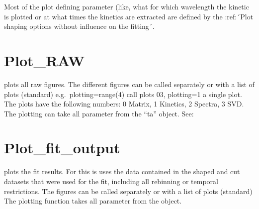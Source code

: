 \documentclass[letterpaper,10pt,english]{sphinxmanual}
\begin{document}
Most of the plot defining parameter (like, what for which wavelength the kinetic
is plotted or at what times the kinetics are extracted are defined by the
:ref:´Plot shaping options without influence on the fitting´.


\section{Plot\_RAW}
\label{\detokenize{Plotting:plot-raw}}
{\hyperref[\detokenize{plot_func:plot_func.TA.Plot_RAW}]{}} plots all raw figures. The different figures can be called
separately or with a list of plots (standard) e.g. plotting=range(4)
call plots 0\sphinxhyphen{}3, plotting=1 a single plot. The plots have the following
numbers: 0 \sphinxhyphen{} Matrix, 1 \sphinxhyphen{} Kinetics, 2 \sphinxhyphen{} Spectra, 3 \sphinxhyphen{} SVD. The plotting
can take all parameter from the “ta” object. See:
{\hyperref[\detokenize{plot_func:plot_func.TA.Plot_RAW}]{}}


\section{Plot\_fit\_output}
\label{\detokenize{Plotting:plot-fit-output}}
{\hyperref[\detokenize{plot_func:plot_func.TA.Plot_fit_output}]{}} plots the fit results. For this is uses the data
contained in the shaped and cut datasets that were used for the fit,
including all rebinning or temporal restrictions. The figures can be
called separately or with a list of plots (standard)
The plotting function takes all parameter from the object.
\begin{quote}

{\hyperref[\detokenize{plot_func:plot_func.TA.Plot_fit_output}]{}}
\end{quote}
\end{document}
